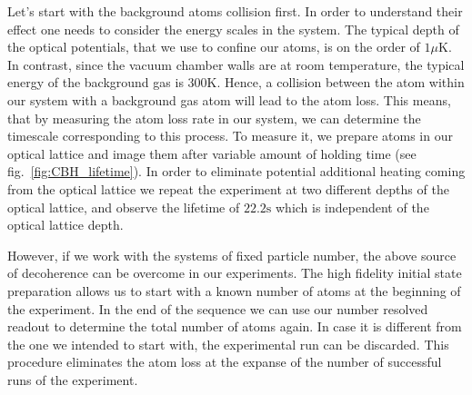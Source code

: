 Let's start with the background atoms collision first. In order to understand their effect one needs to consider the energy scales in the system. The typical depth of the optical potentials, that we use to confine our atoms, is on the order of $1 \mu \textrm{K}$. In contrast, since the vacuum chamber walls are at room temperature, the typical energy of the background gas is $300 \textrm{K}$. Hence, a collision between the atom within our system with a background gas atom will lead to the atom loss. This means, that by measuring the atom loss rate in our system, we can determine the timescale corresponding to this process. To measure it, we prepare atoms in our optical lattice and image them after variable amount of holding time (see fig.~\ref{fig:CBH_lifetime}). In order to eliminate potential additional heating coming from the optical lattice we repeat the experiment at two different depths of the optical lattice, and observe the lifetime of $22.2\textrm{s}$ which is independent of the optical lattice depth.

However, if we work with the systems of fixed particle number, the above source of decoherence can be overcome in our experiments. The high fidelity initial state preparation allows us to start with a known number of atoms at the beginning of the experiment. In the end of the sequence we can use our number resolved readout to determine the total number of atoms again. In case it is different from the one we intended to start with, the experimental run can be discarded. This procedure eliminates the atom loss at the expanse of the number of successful runs of the experiment.  